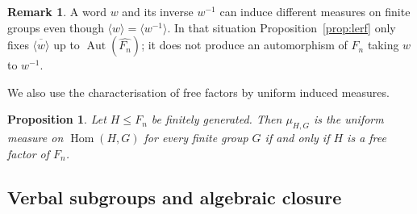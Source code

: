 \documentclass[11pt]{amsart}
\theoremstyle{plain}
\newtheorem{proposition}[theorem]{Proposition}
\theoremstyle{definition}
\newtheorem{remark}[theorem]{Remark}
\newcommand{\Hom}{\operatorname{Hom}}
\newcommand{\Aut}{\operatorname{Aut}}
\begin{document}
\begin{remark}\label{rmk:winverse}
A word $w$ and its inverse $w^{-1}$ can induce different measures on finite
groups even though $\langle w\rangle=\langle w^{-1}\rangle$. In that situation
Proposition~\ref{prop:lerf} only fixes $\overline{\langle w\rangle}$ up to
$\Aut(\widehat{F_n})$; it does not produce an automorphism of $F_n$ taking $w$
to $w^{-1}$. 
\end{remark}
We also use the characterisation of free factors by uniform induced measures.
\begin{proposition}\cite[Parzanchevski--Puder, restated]{PP}\label{prop:uniform}
Let $H\le F_n$ be finitely generated. Then $\mu_{H,G}$ is the uniform measure on
$\Hom(H,G)$ for every finite group $G$ if and only if $H$ is a free factor of
$F_n$.
\end{proposition}


\subsection{Verbal subgroups and algebraic closure}\label{sec:prelim-tools}
\end{document}
